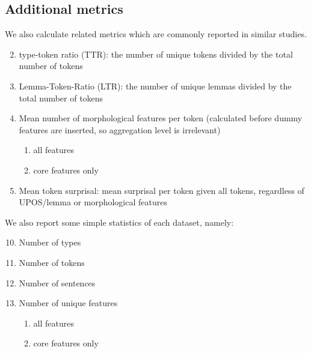 \documentclass[USenglish]{article}
\begin{document}
\subsection{Additional metrics}
We also calculate related metrics which are commonly reported in similar studies.
\begin{enumerate}
  \setcounter{enumi}{1}  %
  \item type-token ratio (TTR): the number of unique tokens divided by the total number of tokens
  \item Lemma-Token-Ratio (LTR): the number of unique lemmas divided by the total number of tokens
  \item Mean number of morphological features per token (calculated before dummy features are inserted, so aggregation level is irrelevant)
      \begin{enumerate}
  \renewcommand{\labelenumi}{\alph{enumi})}
  \item all features
  \item core features only
 \end{enumerate}
   \item Mean token surprisal: mean surprisal per token given all tokens, regardless of UPOS/lemma or morphological features
\end{enumerate}

\noindent We also report some simple statistics of each dataset, namely:

\begin{enumerate}
  \setcounter{enumi}{9}  %
  \item Number of types
  \item Number of tokens
  \item Number of sentences
  \item Number of unique features%
      \begin{enumerate}
    \renewcommand{\labelenumi}{\alph{enumi})}
 \item  all features
  \item core features only
 \end{enumerate}
 \end{enumerate}
\end{document}
